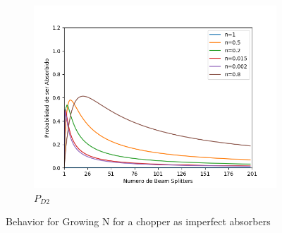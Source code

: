 \documentclass[11pt]{article}
\begin{document}
\begin{figure}[h!]
\begin{subfigure}[b]{0.45\linewidth}
\includegraphics[width=\linewidth]{Chopper_abs.png}
\caption{$P_{D2}$}
\label{fig:BS1}
\end{subfigure}
\caption{Behavior for Growing N for a chopper as imperfect absorbers}
\label{fig:westminster}
\end{figure} 



\renewcommand{\refname}{Bibliografía}






\vspace{1 cm}
\end{document}
